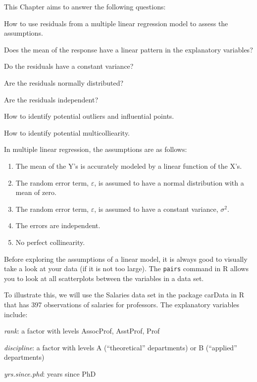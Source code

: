 \documentclass[
  letterpaper,
  DIV=11,
  numbers=noendperiod]{scrreprt}
\providecommand{\tightlist}{%
  \setlength{\itemsep}{0pt}\setlength{\parskip}{0pt}}\usepackage{longtable,booktabs,array}
\begin{document}
This Chapter aims to answer the following questions:

How to use residuals from a multiple linear regression model to assess
the assumptions.

Does the mean of the response have a linear pattern in the explanatory
variables?

Do the residuals have a constant variance?

Are the residuals normally distributed?

Are the residuals independent?

How to identify potential outliers and influential points.

How to identify potential multicolliearity.

In multiple linear regression, the assumptions are as follows:

\begin{enumerate}
\def\labelenumi{\arabic{enumi}.}
\tightlist
\item
  The mean of the Y's is accurately modeled by a linear function of the
  X's.\\
\item
  The random error term, \(\varepsilon\), is assumed to have a normal
  distribution with a mean of zero.\\
\item
  The random error term, \(\varepsilon\), is assumed to have a constant
  variance, \(\sigma^{2}\).\\
\item
  The errors are independent.\\
\item
  No perfect collinearity.\\
\end{enumerate}

Before exploring the assumptions of a linear model, it is always good to
visually take a look at your data (if it is not too large). The
\texttt{pairs} command in R allows you to look at all scatterplots
between the variables in a data set.

To illustrate this, we will use the Salaries data set in the package
carData in R that has 397 observations of salaries for professors. The
explanatory variables include:

\emph{rank}: a factor with levels AssocProf, AsstProf, Prof

\emph{discipline}: a factor with levels A (``theoretical'' departments)
or B (``applied'' departments)

\emph{yrs.since.phd}: years since PhD
\end{document}
